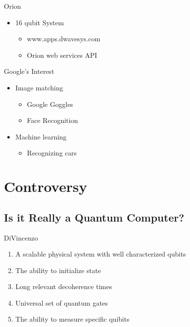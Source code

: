 \documentclass{beamer}
\begin{document}
\begin{frame}{Orion}
\begin{itemize}
  \item 16 qubit System
  \begin{itemize}
   \item www.apps.dwavesys.com
   \item Orion web services API
  \end{itemize}

 \end{itemize}

\end{frame}

\begin{frame}{Google's Interest}
 \begin{itemize}
  \item Image matching
  \begin{itemize}
   \item Google Goggles
   \item Face Recognition
  \end{itemize}
  \item Machine learning
  \begin{itemize}
   \item Recognizing cars
  \end{itemize}

 \end{itemize}

\end{frame}

\section{Controversy}

\subsection{Is it Really a Quantum Computer?}

\begin{frame}{DiVincenzo}
 \begin{enumerate}
  \item A scalable physical system with well characterized qubits
  \item The ability to initialize state
  \item Long relevant decoherence times
  \item Universal set of quantum gates
  \item The ability to measure specific quibits
 \end{enumerate}

\end{frame}
\end{document}
